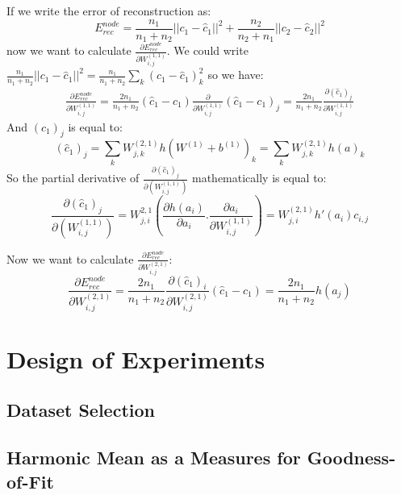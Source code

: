 \documentclass[twoside,12pt]{article}
\begin{document}
If we write the error of reconstruction as:
\begin{equation}
E^{node}_{rec}=\frac{n_1}{n_1+n_2}||c_1-\hat{c}_1||^2+\frac{n_2}{n_2+n_1}||c_2-\hat{c}_2||^2
\end{equation}
now we want to calculate $\frac{\partial E^{node}_{rec}}{\partial W^{(1,1)}_{i,j}}$. We could write $\frac{n_1}{n_1+n_2}||c_1-\hat{c}_1||^2=\frac{n_1}{n_1+n_2}\sum_k{(c_1-\hat{c}_1)^2_k}$ so we have:
\begin{align}
\frac{\partial E^{node}_{rec}}{\partial W^{(1,1)}_{i,j}}=\frac{2n_1}{n_1+n_2}(\hat{c}_1-c_1)\frac{\partial}{\partial W^{(1,1)}_{i,j}}(\hat{c}_1-c_1)_{j}=\frac{2n_1}{n_1+n_2}\frac{\partial (\hat{c}_1)_j}{\partial W^{(1,1)}_{i,j}}
\end{align}
And $(\hat{c}_1)_j$ is equal to:
\begin{equation}
(\hat{c}_1)_j=\sum_{k}W^{(2,1)}_{j,k}h(W^{(1)}+b^{(1)})_k=\sum_kW^{(2,1)}_{j,k}h(a)_k
\end{equation}
So the partial derivative of $\frac{\partial (\hat{c}_1)_j}{\partial (W^{(1,1)}_{i,j})}$ mathematically is equal to:
\begin{equation}
\frac{\partial (\hat{c}_1)_j}{\partial (W^{(1,1)}_{i,j})}= W^{2,1}_{j,i}(\frac{\partial h(a_i)}{\partial a_i}.\frac{\partial a_i}{\partial W^{(1,1)}_{i,j}})=W^{(2,1)}_{j,i}h'(a_i)c_{i,j}
\end{equation}

Now we want to calculate $\frac{\partial E^{node}_{rec}}{\partial W^{(2,1)}_{i,j}}$:
\begin{equation}
\frac{\partial E^{node}_{rec}}{\partial W^{(2,1)}_{i,j}}=\frac{2n_1}{n_1+n_2}\frac{\partial (\hat{c}_1)_i}{\partial W^{(2,1)}_{i,j}}(\hat{c}_1-c_1)=\frac{2n_1}{n_1+n_2}h(a_j)
\end{equation}



\section{Design of Experiments}

\subsection{Dataset Selection}

\subsection{Harmonic Mean  as a Measures for Goodness-of-Fit}
\end{document}
